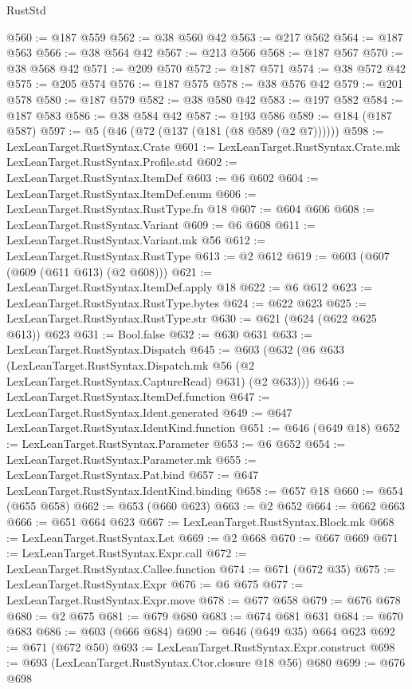 \begin{lexlean}{RustStd}
\begin{coremodule}
@560 := @187 @559
@562 := @38 @560 @42
@563 := @217 @562
@564 := @187 @563
@566 := @38 @564 @42
@567 := @213 @566
@568 := @187 @567
@570 := @38 @568 @42
@571 := @209 @570
@572 := @187 @571
@574 := @38 @572 @42
@575 := @205 @574
@576 := @187 @575
@578 := @38 @576 @42
@579 := @201 @578
@580 := @187 @579
@582 := @38 @580 @42
@583 := @197 @582
@584 := @187 @583
@586 := @38 @584 @42
@587 := @193 @586
@589 := @184 (@187 @587)
@597 := @5 (@46 (@72 (@137 (@181 (@8 @589 (@2 @7))))))
@598 := LexLeanTarget.RustSyntax.Crate
@601 := LexLeanTarget.RustSyntax.Crate.mk LexLeanTarget.RustSyntax.Profile.std
@602 := LexLeanTarget.RustSyntax.ItemDef
@603 := @6 @602
@604 := LexLeanTarget.RustSyntax.ItemDef.enum
@606 := LexLeanTarget.RustSyntax.RustType.fn @18
@607 := @604 @606
@608 := LexLeanTarget.RustSyntax.Variant
@609 := @6 @608
@611 := LexLeanTarget.RustSyntax.Variant.mk @56
@612 := LexLeanTarget.RustSyntax.RustType
@613 := @2 @612
@619 := @603 (@607 (@609 (@611 @613) (@2 @608)))
@621 := LexLeanTarget.RustSyntax.ItemDef.apply @18
@622 := @6 @612
@623 := LexLeanTarget.RustSyntax.RustType.bytes
@624 := @622 @623
@625 := LexLeanTarget.RustSyntax.RustType.str
@630 := @621 (@624 (@622 @625 @613)) @623
@631 := Bool.false
@632 := @630 @631
@633 := LexLeanTarget.RustSyntax.Dispatch
@645 := @603
    (@632
      (@6
        @633
        (LexLeanTarget.RustSyntax.Dispatch.mk @56 (@2 LexLeanTarget.RustSyntax.CaptureRead) @631)
        (@2 @633)))
@646 := LexLeanTarget.RustSyntax.ItemDef.function
@647 := LexLeanTarget.RustSyntax.Ident.generated
@649 := @647 LexLeanTarget.RustSyntax.IdentKind.function
@651 := @646 (@649 @18)
@652 := LexLeanTarget.RustSyntax.Parameter
@653 := @6 @652
@654 := LexLeanTarget.RustSyntax.Parameter.mk
@655 := LexLeanTarget.RustSyntax.Pat.bind
@657 := @647 LexLeanTarget.RustSyntax.IdentKind.binding
@658 := @657 @18
@660 := @654 (@655 @658)
@662 := @653 (@660 @623)
@663 := @2 @652
@664 := @662 @663
@666 := @651 @664 @623
@667 := LexLeanTarget.RustSyntax.Block.mk
@668 := LexLeanTarget.RustSyntax.Let
@669 := @2 @668
@670 := @667 @669
@671 := LexLeanTarget.RustSyntax.Expr.call
@672 := LexLeanTarget.RustSyntax.Callee.function
@674 := @671 (@672 @35)
@675 := LexLeanTarget.RustSyntax.Expr
@676 := @6 @675
@677 := LexLeanTarget.RustSyntax.Expr.move
@678 := @677 @658
@679 := @676 @678
@680 := @2 @675
@681 := @679 @680
@683 := @674 @681 @631
@684 := @670 @683
@686 := @603 (@666 @684)
@690 := @646 (@649 @35) @664 @623
@692 := @671 (@672 @50)
@693 := LexLeanTarget.RustSyntax.Expr.construct
@698 := @693 (LexLeanTarget.RustSyntax.Ctor.closure @18 @56) @680
@699 := @676 @698

\end{coremodule}
\end{lexlean}
